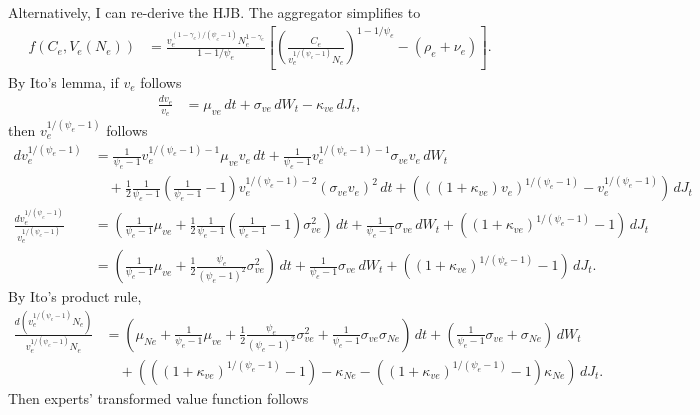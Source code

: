 \documentclass[12 pt, oneside]{article}
\theoremstyle{definition}
\theoremstyle{definition}
\theoremstyle{definition}
\begin{document}
Alternatively, I can re-derive the HJB. The aggregator simplifies to
\begin{align*}
f(C_e, V_e(N_e)) & = \frac{v_e^{(1 - \gamma_e) / (\psi_e - 1)} N_e^{ 1- \gamma_e}}{1 - 1/\psi_e}\left[\left(\frac{C_e}{v_e^{1 / (\psi_e - 1)}N_e  }\right)^{1 - 1 / \psi_e} - (\rho_e + \nu_e)\right].
\end{align*}
By Ito's lemma, if $v_e$ follows
\begin{align*}
  \frac{dv_e}{v_e} & = \mu_{ve}\, dt + \sigma_{ve}\, dW_t - \kappa_{ve}\, dJ_t,
\end{align*}
then $v_e^{1 / (\psi_e - 1)}$ follows
\begin{align*}
  dv_e^{1 / (\psi_e - 1)} & = \frac{1}{\psi_e - 1} v_e^{1 / (\psi_e - 1) - 1} \mu_{ve}v_e\, dt + \frac{1}{\psi_e - 1} v_e^{1 / (\psi_e - 1) - 1} \sigma_{ve}v_e\, dW_t\\
                                       &\quad + \frac{1}{2}\frac{1 }{\psi_e - 1}\left(\frac{1 }{\psi_e - 1} - 1\right)v_e^{1 / (\psi_e - 1) - 2}(\sigma_{ve} v_e)^2\, dt + (((1 + \kappa_{ve})v_e)^{1 / (\psi_e - 1)} - v_e^{1 / (\psi_e - 1)})\, dJ_t\\
\frac{dv_e^{1 / (\psi_e - 1)}}{v_e^{1 / (\psi_e - 1)}} & =\left( \frac{1}{\psi_e - 1}\mu_{ve}  + \frac{1}{2}\frac{1}{\psi_e - 1}\left(\frac{1}{\psi_e  - 1} - 1\right) \sigma_{ve}^2 \right)\, dt + \frac{1}{\psi_e - 1}\sigma_{ve}\, dW_t + ( (1 + \kappa_{ve})^{1 / (\psi_e - 1)} - 1)\, dJ_t\\
                          & = \left( \frac{1}{\psi_e - 1}\mu_{ve}  + \frac{1}{2}\frac{\psi_e}{(\psi_e - 1)^2} \sigma_{ve}^2 \right)\, dt + \frac{1}{\psi_e - 1}\sigma_{ve}\, dW_t + ( (1 + \kappa_{ve})^{1 / (\psi_e - 1)} - 1)\, dJ_t.
\end{align*}
By Ito's product rule,
\begin{align*}
  \frac{d(v_e^{1 / (\psi_e - 1)} N_e)}{v_e^{1 / (\psi_e - 1)} N_e} & = \left(\mu_{Ne} + \frac{1}{\psi_e - 1}\mu_{ve} + \frac{1}{2}\frac{\psi_e}{(\psi_e - 1)^2}\sigma_{ve}^2 + \frac{1}{\psi_e - 1}\sigma_{ve}\sigma_{Ne}\right)\, dt + \left(\frac{1}{\psi_e - 1}\sigma_{ve} + \sigma_{Ne}\right)\, dW_t \\
                                                                   &\quad + ( ((1 + \kappa_{ve})^{1 / (\psi_e - 1)} - 1) - \kappa_{Ne} - ((1 + \kappa_{ve})^{1 / (\psi_e - 1)} - 1)\kappa_{Ne})\, dJ_t.
\end{align*}
Then experts' transformed value function follows
\end{document}
